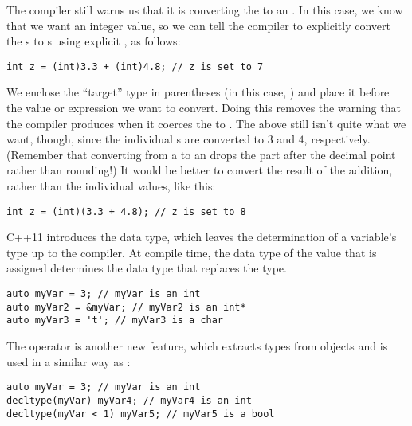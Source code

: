 The compiler still warns us that it is converting the  to an . 
In this case, we know that we want an integer value, so we can tell the compiler to explicitly convert the s to s using explicit , as follows:

\noindent\begin{minipage}{\linewidth}\begin{lstlisting}
int z = (int)3.3 + (int)4.8; // z is set to 7
\end{lstlisting}\end{minipage}

We enclose the ``target'' type in parentheses (in this case, ) and place it before the value or expression we want to convert. 
Doing this removes the warning that the compiler produces when it coerces the  to . 
The above still isn't quite what we want, though, since the individual s are converted to $3$ and $4$, respectively. 
(Remember that converting from a  to an  drops the part after the decimal point rather than rounding!) 
It would be better to convert the result of the addition, rather than the individual values, like this:

\noindent\begin{minipage}{\linewidth}\begin{lstlisting}
int z = (int)(3.3 + 4.8); // z is set to 8
\end{lstlisting}\end{minipage}


C++11 introduces the  data type, which leaves the determination of a variable's type up to the compiler. 
At compile time, the data type of the value that is assigned determines the data type that replaces the  type.

\noindent\begin{minipage}{\linewidth}\begin{lstlisting}
auto myVar = 3; // myVar is an int
auto myVar2 = &myVar; // myVar2 is an int*
auto myVar3 = 't'; // myVar3 is a char
\end{lstlisting}\end{minipage}

The  operator is another new feature, which extracts types from objects and is used in a similar way as :

\noindent\begin{minipage}{\linewidth}\begin{lstlisting}
auto myVar = 3; // myVar is an int
decltype(myVar) myVar4; // myVar4 is an int
decltype(myVar < 1) myVar5; // myVar5 is a bool
\end{lstlisting}\end{minipage}

